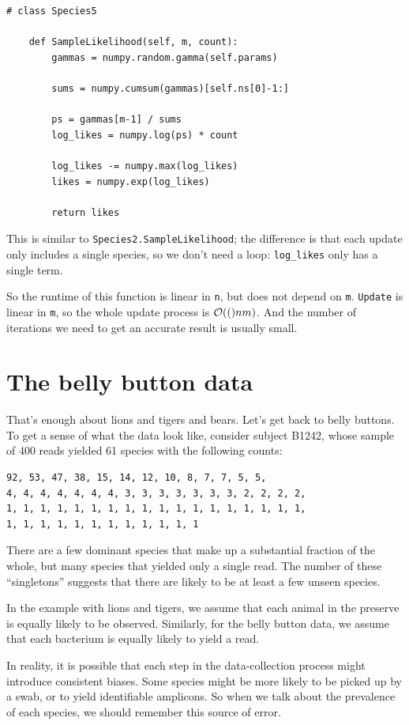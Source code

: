 \documentclass[12pt]{book}
\begin{document}
\begin{verbatim}
# class Species5

    def SampleLikelihood(self, m, count):
        gammas = numpy.random.gamma(self.params)

        sums = numpy.cumsum(gammas)[self.ns[0]-1:]

        ps = gammas[m-1] / sums
        log_likes = numpy.log(ps) * count

        log_likes -= numpy.max(log_likes)
        likes = numpy.exp(log_likes)

        return likes
\end{verbatim}

This is similar to {\tt Species2.SampleLikelihood}; the
difference is that each update only includes a single species,
so we don't need a loop: \verb"log_likes" only has a single term.

So the runtime of this function is linear in {\tt n}, but does not
depend on {\tt m}.  {\tt Update} is linear in {\tt m}, so the
whole update process is $\mathcal{O}(()n m)$.  And the number of iterations
we need to get an accurate result is usually small.


\section{The belly button data}
\label{belly}

That's enough about lions and tigers and bears.
Let's get back to belly buttons.  To get a sense of what the
data look like, consider subject B1242,
whose sample of 400 reads yielded 61 species with the following
counts:

\begin{verbatim}
92, 53, 47, 38, 15, 14, 12, 10, 8, 7, 7, 5, 5, 
4, 4, 4, 4, 4, 4, 4, 3, 3, 3, 3, 3, 3, 3, 2, 2, 2, 2,
1, 1, 1, 1, 1, 1, 1, 1, 1, 1, 1, 1, 1, 1, 1, 1, 1, 1,
1, 1, 1, 1, 1, 1, 1, 1, 1, 1, 1, 1
\end{verbatim}

There are a few dominant species that make up a substantial
fraction of the whole, but many species that yielded only
a single read.  The number of these ``singletons'' suggests
that there are likely to be at least a few unseen species.

In the example with lions and tigers, we assume that each
animal in the preserve is equally likely to be observed.
Similarly, for the belly button data, we assume that each
bacterium is equally likely to yield a read.

In reality, it is possible that each step in the data-collection
process might introduce consistent biases.  Some species might
be more likely to be picked up by a swab, or to yield identifiable
amplicons.  So when we talk about the prevalence of each species,
we should remember this source of error.
\end{document}
